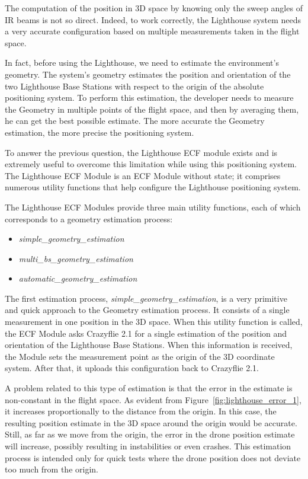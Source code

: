 The computation of the position in 3D space by knowing only the sweep angles of IR beams is not so direct. 
Indeed, to work correctly, the Lighthouse system needs a very accurate configuration based on multiple measurements taken in the flight space.

In fact, before using the Lighthouse, we need to estimate the environment's geometry. 
The system's geometry estimates the position and orientation of the two Lighthouse Base Stations with respect to the origin of the absolute positioning system.
To perform this estimation, the developer needs to measure the Geometry in multiple points of the flight space, and then by averaging them, he can get the best possible estimate.
The more accurate the Geometry estimation, the more precise the positioning system.

To answer the previous question, the Lighthouse ECF module exists and is extremely useful to overcome this limitation while using this positioning system.
The Lighthouse ECF Module is an ECF Module without state; it comprises numerous utility functions that help configure the Lighthouse positioning system.

The Lighthouse ECF Modules provide three main utility functions, each of which corresponds to a geometry estimation process:
\begin{itemize}
    \item \textit{simple\_geometry\_estimation}
    \item \textit{multi\_bs\_geometry\_estimation}
    \item \textit{automatic\_geometry\_estimation}
\end{itemize}
The first estimation process, \textit{simple\_geometry\_estimation}, is a very primitive and quick approach to the Geometry estimation process. 
It consists of a single measurement in one position in the 3D space. 
When this utility function is called, the ECF Module asks Crazyflie 2.1 for a single estimation of the position and orientation of the Lighthouse Base Stations.
When this information is received, the Module sets the measurement point as the origin of the 3D coordinate system. 
After that, it uploads this configuration back to Crazyflie 2.1.

A problem related to this type of estimation is that the error in the estimate is non-constant in the flight space. 
As evident from Figure~\ref{fig:lighthouse_error_1}, it increases proportionally to the distance from the origin.
In this case, the resulting position estimate in the 3D space around the origin would be accurate. 
Still, as far as we move from the origin, the error in the drone position estimate will increase, possibly resulting in instabilities or even crashes.
This estimation process is intended only for quick tests where the drone position does not deviate too much from the origin.

